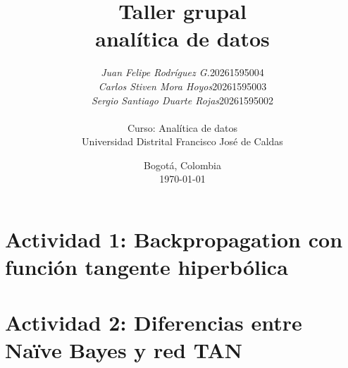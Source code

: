 \documentclass[11pt,a4paper]{article}
\title{%
    \textbf{Taller grupal}\\[6pt]
    \LARGE analítica de datos
}
\author{%
    \Large
    \begin{tabular}{ll}
        \textit{Juan Felipe Rodríguez G.} & 20261595004 \\[4pt]
        \textit{Carlos Stiven Mora Hoyos} & 20261595003 \\[4pt]
        \textit{Sergio Santiago Duarte Rojas} & 20261595002
    \end{tabular}\\[4em]
    \large Curso: Analítica de datos\\[1.5em]
    \large Universidad Distrital Francisco José de Caldas
}
\date{\vspace{2em}\large Bogotá, Colombia \\ \today}
\theoremstyle{definition}
\theoremstyle{plain}
\theoremstyle{remark}
\begin{document}
\maketitle
\thispagestyle{fancy}

\clearpage
\tableofcontents
\clearpage


\section{Actividad 1: Backpropagation con función tangente hiperbólica}


\section{Actividad 2: Diferencias entre Naïve Bayes y red TAN}

\end{document}
